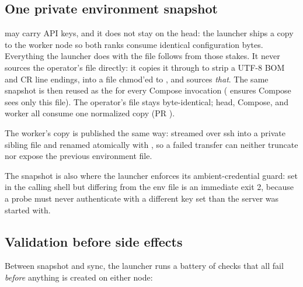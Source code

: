 \subsection{One private environment snapshot}

 may carry API keys, and it does not stay on the head:
the launcher ships a copy to the worker node so both ranks consume identical
configuration bytes. Everything the launcher does with the file follows from
those stakes. It never sources the operator's file directly: it copies it
through  to strip a UTF-8 BOM and CR line endings, into a
 file chmod'ed to , and sources \emph{that}. The
same snapshot is then reused as the  for every Compose
invocation ( ensures Compose sees only this
file). The operator's file stays byte-identical; head, Compose, and worker
all consume one normalized copy (PR ).

The worker's copy is published the same way: streamed over ssh into a
private  sibling file and renamed atomically with
, so a failed transfer can neither truncate nor expose the
previous environment file.

The snapshot is also where the launcher enforces its ambient-credential guard:
 set in the calling shell but differing from the env
file is an immediate exit 2, because a probe must never authenticate with a
different key set than the server was started with.

\subsection{Validation before side effects}

Between snapshot and sync, the launcher runs a battery of checks that all fail
\emph{before} anything is created on either node:

